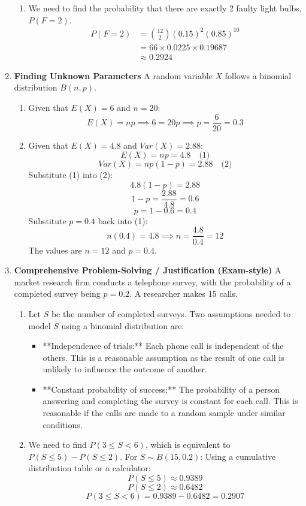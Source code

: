 \documentclass[12pt]{article}
\begin{document}
\begin{enumerate}
\begin{enumerate}
        \item We need to find the probability that there are exactly 2 faulty light bulbs, $P(F=2)$.
        \begin{align*}
        P(F=2) &= \binom{12}{2} (0.15)^2 (0.85)^{10} \\
        &= 66 \times 0.0225 \times 0.19687 \\
        &\approx 0.2924
        \end{align*}
    \end{enumerate}

    \item \textbf{Finding Unknown Parameters}
    A random variable $X$ follows a binomial distribution $B(n, p)$.
    \begin{enumerate}
        \item Given that $E(X) = 6$ and $n=20$:
        $$ E(X) = np \implies 6 = 20p \implies p = \frac{6}{20} = 0.3 $$

        \item Given that $E(X) = 4.8$ and $Var(X) = 2.88$:
        $$ E(X) = np = 4.8 \quad \text{(1)} $$
        $$ Var(X) = np(1-p) = 2.88 \quad \text{(2)} $$
        Substitute (1) into (2):
        $$ 4.8(1-p) = 2.88 $$
        $$ 1-p = \frac{2.88}{4.8} = 0.6 $$
        $$ p = 1 - 0.6 = 0.4 $$
        Substitute $p=0.4$ back into (1):
        $$ n(0.4) = 4.8 \implies n = \frac{4.8}{0.4} = 12 $$
        The values are $n=12$ and $p=0.4$.
    \end{enumerate}

    \item \textbf{Comprehensive Problem-Solving / Justification (Exam-style)}
    A market research firm conducts a telephone survey, with the probability of a completed survey being $p=0.2$. A researcher makes 15 calls.
    \begin{enumerate}
        \item Let $S$ be the number of completed surveys. Two assumptions needed to model $S$ using a binomial distribution are:
        \begin{itemize}
            \item **Independence of trials:** Each phone call is independent of the others. This is a reasonable assumption as the result of one call is unlikely to influence the outcome of another.
            \item **Constant probability of success:** The probability of a person answering and completing the survey is constant for each call. This is reasonable if the calls are made to a random sample under similar conditions.
        \end{itemize}

        \item We need to find $P(3 \le S < 6)$, which is equivalent to $P(S \le 5) - P(S \le 2)$. For $S \sim B(15, 0.2)$:
        Using a cumulative distribution table or a calculator:
        $$ P(S \le 5) \approx 0.9389 $$
        $$ P(S \le 2) \approx 0.6482 $$
        $$ P(3 \le S < 6) = 0.9389 - 0.6482 = 0.2907 $$
    \end{enumerate}
\end{enumerate}
\end{document}
